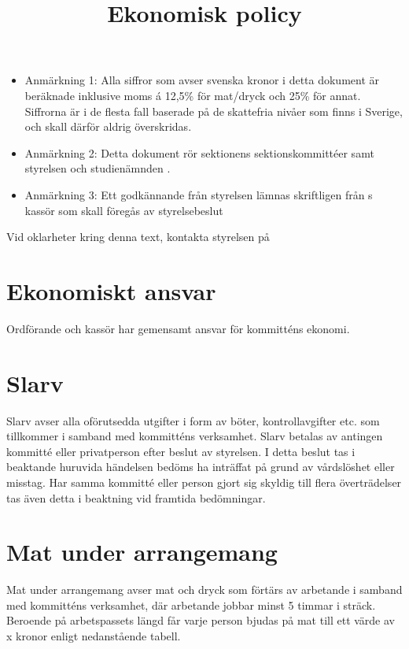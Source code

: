 \documentclass[11pt, includeaddress]{../../classes/cthit}
\begin{document}
\title{Ekonomisk policy}
\maketitle

\thispagestyle{empty}

\newpage

\makeheadfoot%

\setcounter{tocdepth}{2}
\setcounter{page}{1}
\tableofcontents

\newpage

\begin{itemize}
	\item Anmärkning 1: Alla siffror som avser svenska kronor i detta dokument är beräknade inklusive moms á 12,5\% för mat/dryck och 25\% för annat. Siffrorna är i de flesta fall baserade på de skattefria nivåer som finns i Sverige, och skall därför aldrig överskridas.
	\item Anmärkning 2: Detta dokument rör sektionens sektionskommittéer samt styrelsen \STYRIT och studienämnden \SNIT. 
	\item Anmärkning 3: Ett godkännande från styrelsen lämnas skriftligen från \STYRIT{}s kassör som skall föregås av styrelsebeslut
\end{itemize}

Vid oklarheter kring denna text, kontakta styrelsen på 


\section{Ekonomiskt ansvar}
Ordförande och kassör har gemensamt ansvar för kommitténs ekonomi.


\section{Slarv}
Slarv avser alla oförutsedda utgifter i form av böter, kontrollavgifter etc. som tillkommer i samband med kommitténs verksamhet. Slarv betalas av antingen kommitté eller privatperson efter beslut av styrelsen. I detta beslut tas i beaktande huruvida händelsen bedöms ha inträffat på grund av vårdslöshet eller misstag. Har samma kommitté eller person gjort sig skyldig till flera överträdelser tas även detta i beaktning vid framtida bedömningar.


\section{Mat under arrangemang}
Mat under arrangemang avser mat och dryck som förtärs av arbetande i samband med kommitténs verksamhet, där arbetande jobbar minst 5 timmar i sträck. Beroende på arbetspassets längd får varje person bjudas på mat till ett värde av x kronor enligt nedanstående tabell.
\end{document}
